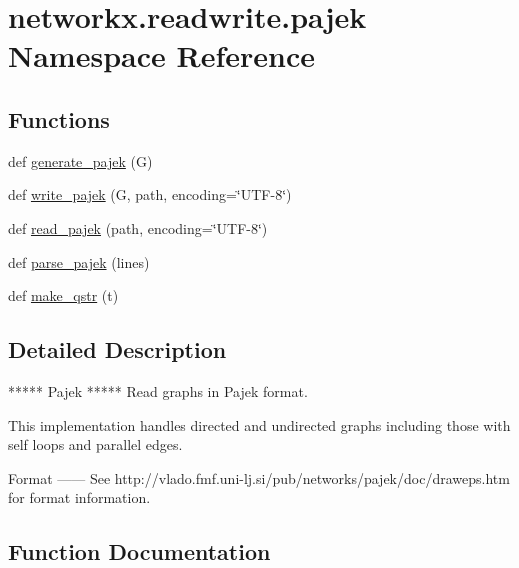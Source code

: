 \hypertarget{namespacenetworkx_1_1readwrite_1_1pajek}{}\section{networkx.\+readwrite.\+pajek Namespace Reference}
\label{namespacenetworkx_1_1readwrite_1_1pajek}
\subsection*{Functions}
\begin{DoxyCompactItemize}
\item 
def \hyperlink{namespacenetworkx_1_1readwrite_1_1pajek_a9903e63244c0ce03b4e8a02edd9c521b}{generate\+\_\+pajek} (G)
\item 
def \hyperlink{namespacenetworkx_1_1readwrite_1_1pajek_a280d279fd8b6591d4019046899eec5b1}{write\+\_\+pajek} (G, path, encoding=\char`\"{}U\+TF-\/8\char`\"{})
\item 
def \hyperlink{namespacenetworkx_1_1readwrite_1_1pajek_ad51f4ac8ecbd12782be218e31a98380d}{read\+\_\+pajek} (path, encoding=\char`\"{}U\+TF-\/8\char`\"{})
\item 
def \hyperlink{namespacenetworkx_1_1readwrite_1_1pajek_a209aa5831d8b00d51d17f6350018b4bb}{parse\+\_\+pajek} (lines)
\item 
def \hyperlink{namespacenetworkx_1_1readwrite_1_1pajek_adda16690a7a608d9cb3404328762c8d6}{make\+\_\+qstr} (t)
\end{DoxyCompactItemize}


\subsection{Detailed Description}
\begin{DoxyVerb}*****
Pajek
*****
Read graphs in Pajek format.

This implementation handles directed and undirected graphs including
those with self loops and parallel edges.

Format
------
See http://vlado.fmf.uni-lj.si/pub/networks/pajek/doc/draweps.htm
for format information.\end{DoxyVerb}
 

\subsection{Function Documentation}
\mbox{\label{namespacenetworkx_1_1readwrite_1_1pajek_a9903e63244c0ce03b4e8a02edd9c521b}} 
